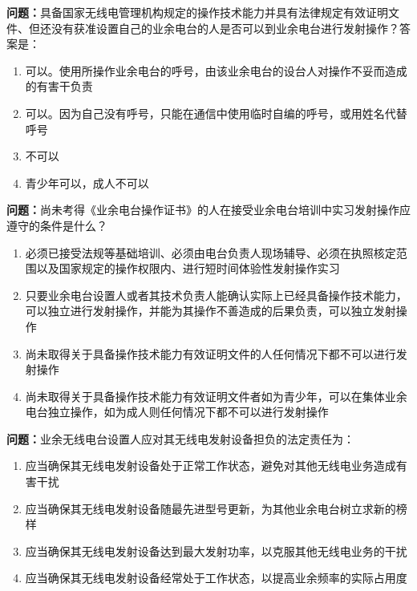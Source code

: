 \bigskip


\noindent\textbf{问题：}具备国家无线电管理机构规定的操作技术能力并具有法律规定有效证明文件、但还没有获准设置自己的业余电台的人是否可以到业余电台进行发射操作？答案是：
\begin{enumerate}[label=\Alph*), leftmargin=3em]
\item 可以。使用所操作业余电台的呼号，由该业余电台的设台人对操作不妥而造成的有害干负责
\item 可以。因为自己没有呼号，只能在通信中使用临时自编的呼号，或用姓名代替呼号
\item 不可以
\item 青少年可以，成人不可以
\end{enumerate}

\bigskip


\noindent\textbf{问题：}尚未考得《业余电台操作证书》的人在接受业余电台培训中实习发射操作应遵守的条件是什么？
\begin{enumerate}[label=\Alph*), leftmargin=3em]
\item 必须已接受法规等基础培训、必须由电台负责人现场辅导、必须在执照核定范围以及国家规定的操作权限内、进行短时间体验性发射操作实习
\item 只要业余电台设置人或者其技术负责人能确认实际上已经具备操作技术能力，可以独立进行发射操作，并能为其操作不善造成的后果负责，可以独立发射操作
\item 尚未取得关于具备操作技术能力有效证明文件的人任何情况下都不可以进行发射操作
\item 尚未取得关于具备操作技术能力有效证明文件者如为青少年，可以在集体业余电台独立操作，如为成人则任何情况下都不可以进行发射操作
\end{enumerate}

\bigskip


\noindent\textbf{问题：}业余无线电台设置人应对其无线电发射设备担负的法定责任为：
\begin{enumerate}[label=\Alph*), leftmargin=3em]
\item 应当确保其无线电发射设备处于正常工作状态，避免对其他无线电业务造成有害干扰
\item 应当确保其无线电发射设备随最先进型号更新，为其他业余电台树立求新的榜样
\item 应当确保其无线电发射设备达到最大发射功率，以克服其他无线电业务的干扰
\item 应当确保其无线电发射设备经常处于工作状态，以提高业余频率的实际占用度
\end{enumerate}

\bigskip



